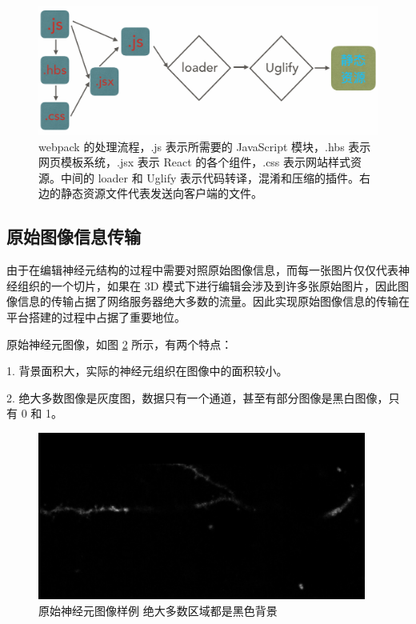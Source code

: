 \begin{figure}[!ht]
\centering
\includegraphics[width=148mm]{images/webpack}
\caption{webpack 的处理流程，.js 表示所需要的 JavaScript 模块，.hbs 表示网页模板系统，.jsx 表示 React  的各个组件，.css 表示网站样式资源。中间的 loader 和 Uglify 表示代码转译，混淆和压缩的插件。右边的静态资源文件代表发送向客户端的文件。}
\label{webpack-flow}
\end{figure}

\subsection{原始图像信息传输}
由于在编辑神经元结构的过程中需要对照原始图像信息，而每一张图片仅仅代表神经组织的一个切片，如果在 3D 模式下进行编辑会涉及到许多张原始图片，因此图像信息的传输占据了网络服务器绝大多数的流量。因此实现原始图像信息的传输在平台搭建的过程中占据了重要地位。

原始神经元图像，如图 \ref{neu} 所示，有两个特点：

1. 背景面积大，实际的神经元组织在图像中的面积较小。

2. 绝大多数图像是灰度图，数据只有一个通道，甚至有部分图像是黑白图像，只有 0 和 1。

\begin{figure}[!ht]
\centering
\includegraphics[width=108mm]{images/neu}
\caption{原始神经元图像样例 绝大多数区域都是黑色背景}
\label{neu}
\end{figure}

